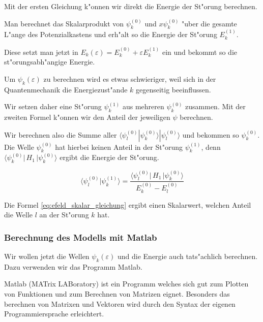 \begin{refsection}
Mit der ersten Gleichung k"onnen wir direkt die Energie der St"orung berechnen.

Man berechnet das Skalarprodukt von $\psi_k^{(0)}$ und $x \psi_k^{(0)}$ "uber 
die gesamte L"ange des Potenzialkastens und erh"alt so die Energie der St"orung $E_k^{(1)}$.

Diese setzt man jetzt in $E_k(\varepsilon)=E_k^{(0)} + \varepsilon E_k^{(1)}$ ein und bekommt so die st"orungsabh"angige Energie.

Um $\psi_k(\varepsilon)$ zu berechnen wird es etwas schwieriger, weil sich in der Quantenmechanik die Energiezust"ande $k$ gegenseitig beeinflussen.

Wir setzen daher eine St"orung $\psi_k^{(1)}$ aus mehreren $\psi_k^{(0)}$ zusammen.
Mit der zweiten Formel k"onnen wir den Anteil der jeweiligen $\psi$ berechnen.

Wir berechnen also die Summe aller $\langle\psi_l^{(0)}|\psi_k^{(0)}\rangle|\psi_l^{(0)}\rangle$
und bekommen so $\psi_k^{(0)}$.
Die Welle $\psi_k^{(0)}$ hat hierbei keinen Anteil in der St"orung $\psi_k^{(1)}$,
denn $\langle \psi_k^{(0)}|\, H_1 \,|\psi_k^{(0)}\rangle$ ergibt die Energie der St"orung.







\begin{equation}
  \label{eq:efeld_skalar_gleichung}
  \langle\psi_l^{(0)}|\psi_k^{(1)}\rangle
      =
  \frac{\langle \psi_l^{(0)}|\, H_1 \,|\psi_k^{(0)}\rangle}{E_k^{(0)}-E_l^{(0)}}
\end{equation}

Die Formel \ref{eq:efeld_skalar_gleichung} ergibt einen Skalarwert, welchen Anteil die Welle $l$ an der St"orung $k$ hat.









\subsubsection{Berechnung des Modells mit Matlab}

Wir wollen jetzt die Wellen $\psi_k(\varepsilon)$ und die Energie auch tats"achlich berechnen.
Dazu verwenden wir das Programm Matlab.

Matlab (MATrix LABoratory) ist ein Programm welches sich gut zum Plotten von Funktionen
und zum Berechnen von Matrizen eignet.
Besonders das berechnen von Matrixen und Vektoren wird durch den Syntax der eigenen Programmiersprache erleichtert.


\end{refsection}
